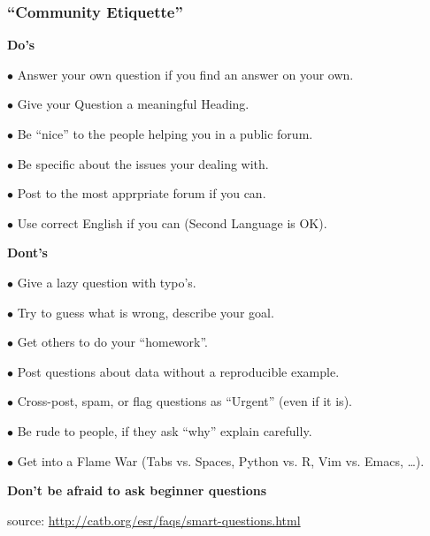 \documentclass{beamer}
\begin{document}
    \begin{frame}[shrink=15]
    \frametitle{``Community Etiquette''}
    
     \begin{center}
      \textbf{Do's}
     \end{center}
     
    $\bullet$ Answer your own question if you find an answer on your own.

    $\bullet$ Give your Question a meaningful Heading.

    $\bullet$ Be ``nice'' to the people helping you in a public forum.

    $\bullet$ Be specific about the issues your dealing with.
    
    $\bullet$ Post to the most apprpriate forum if you can.
    
    $\bullet$ Use correct English if you can (Second Language is OK).
    
     \begin{center}
      \textbf{Dont's}
     \end{center}
     
    $\bullet$ Give a lazy question with typo's.

    $\bullet$ Try to guess what is wrong, describe your goal.

    $\bullet$ Get others to do your ``homework''.

    $\bullet$ Post questions about data without a reproducible example.
    
    $\bullet$ Cross-post, spam, or flag questions as ``Urgent'' (even if it is).
    
    $\bullet$ Be rude to people, if they ask ``why'' explain carefully.
    
    $\bullet$ Get into a Flame War (Tabs vs. Spaces, Python vs. R, Vim vs. Emacs, \ldots ).
    
     \begin{center}
      \textbf{Don't be afraid to ask beginner questions}
     \end{center}
     
     source: \url{http://catb.org/esr/faqs/smart-questions.html}
     
     \end{frame}
  
\end{document}
